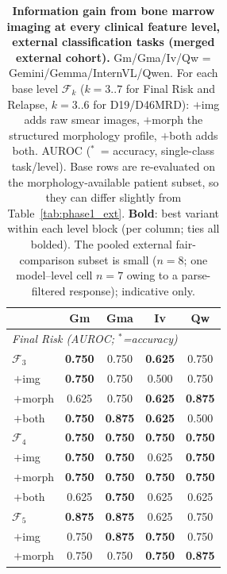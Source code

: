 \documentclass[pdflatex,sn-nature]{sn-jnl}
\begin{document}
\begin{table}[p]
\caption{\textbf{Information gain from bone marrow imaging at every
clinical feature level, external classification tasks (merged external
cohort).} Gm/Gma/Iv/Qw =
Gemini/Gemma/InternVL/Qwen. For each base level $\mathcal{F}_k$
($k=3..7$ for Final Risk and Relapse, $k=3..6$ for D19/D46MRD): $+$img
adds raw smear images, $+$morph the structured morphology profile,
$+$both adds both. AUROC ($^*$~= accuracy, single-class task/level).
Base rows are re-evaluated on the morphology-available patient subset,
so they can differ slightly from Table~\ref{tab:phase1_ext}.
\textbf{Bold}: best variant within each level block (per column; ties
all bolded). The pooled external fair-comparison subset is small
($n{=}8$; one model--level cell $n{=}7$ owing to a parse-filtered
response); indicative only.}
\label{tab:imgmorph_ext_cls}
\centering
\tiny
\renewcommand{\arraystretch}{0.5}
\setlength{\tabcolsep}{28pt}
\setlength{\aboverulesep}{0.5pt}
\setlength{\belowrulesep}{0.5pt}
\begin{tabular}{@{}l cccc@{}}
\toprule
 & Gm & Gma & Iv & Qw \\
\midrule
\multicolumn{5}{l}{\textit{Final Risk (AUROC; $^*$=accuracy)}} \\
$\mathcal{F}_3$      & \textbf{0.750} & 0.750 & \textbf{0.625} & 0.750 \\
\;\,$+$img           & \textbf{0.750} & 0.750 & 0.500 & 0.750 \\
\;\,$+$morph         & 0.625 & 0.750 & \textbf{0.625} & \textbf{0.875} \\
\;\,$+$both          & \textbf{0.750} & \textbf{0.875} & \textbf{0.625} & 0.500 \\
\addlinespace[0.3pt]
$\mathcal{F}_4$      & \textbf{0.750} & \textbf{0.750} & \textbf{0.750} & \textbf{0.750} \\
\;\,$+$img           & \textbf{0.750} & \textbf{0.750} & 0.625 & \textbf{0.750} \\
\;\,$+$morph         & \textbf{0.750} & \textbf{0.750} & \textbf{0.750} & \textbf{0.750} \\
\;\,$+$both          & 0.625 & \textbf{0.750} & 0.625 & 0.625 \\
\addlinespace[0.3pt]
$\mathcal{F}_5$      & \textbf{0.875} & \textbf{0.875} & 0.625 & 0.750 \\
\;\,$+$img           & 0.750 & \textbf{0.875} & \textbf{0.750} & 0.750 \\
\;\,$+$morph         & 0.750 & 0.750 & \textbf{0.750} & \textbf{0.875} \\

\end{tabular}
\end{table}
\end{document}
